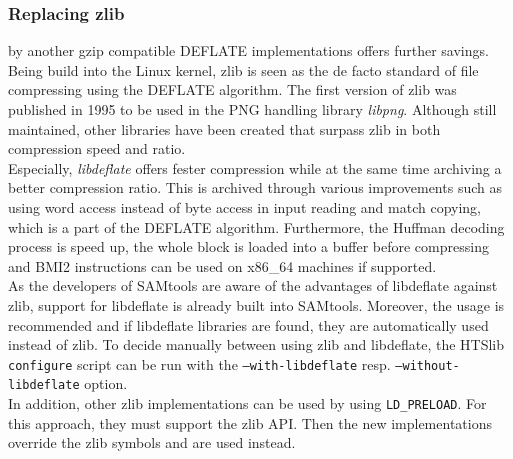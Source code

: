 \subsubsection{Replacing zlib} by another gzip compatible DEFLATE implementations offers further savings. Being build into the Linux kernel, zlib is seen as the de facto standard of file compressing using the DEFLATE algorithm. The first version of zlib was published in 1995 to be used in the PNG handling library \textit{libpng}. Although still maintained, other libraries have been created that surpass zlib in both compression speed and ratio.\\
Especially, \textit{libdeflate}\cite{biggers_ebiggerslibdeflate_2024} offers fester compression while at the same time archiving a better compression ratio. This is archived through various improvements such as using word access instead of byte access in input reading and match copying, which is a part of the DEFLATE algorithm. Furthermore, the Huffman decoding process is speed up, the whole block is loaded into a buffer before compressing and BMI2 instructions can be used on x86\_64 machines if supported. \\
As the developers of SAMtools are aware of the advantages of libdeflate against zlib, support for libdeflate is already built into SAMtools. Moreover, the usage is recommended and if libdeflate libraries are found, they are automatically used instead of zlib. To decide manually between using zlib and libdeflate, the HTSlib \texttt{configure} script can be run with the \texttt{--with-libdeflate} resp. \texttt{--without-libdeflate} option. \\
In addition, other zlib implementations can be used by using \texttt{LD\_PRELOAD}. For this approach, they must support the zlib API. Then the new implementations override the zlib symbols and are used instead. 
